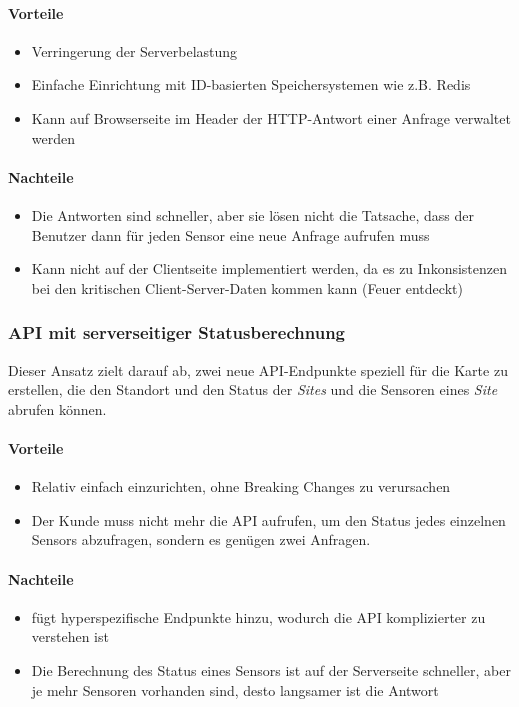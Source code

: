 \paragraph{Vorteile}
\begin{itemize}
  \item Verringerung der Serverbelastung
  \item Einfache Einrichtung mit ID-basierten Speichersystemen wie z.B. Redis
  \item Kann auf Browserseite im Header der \ac{HTTP}-Antwort einer Anfrage verwaltet werden
\end{itemize}

\paragraph{Nachteile}
\begin{itemize}
  \item Die Antworten sind schneller, aber sie lösen nicht die Tatsache, dass der Benutzer dann für jeden Sensor eine neue Anfrage aufrufen muss
  \item Kann nicht auf der Clientseite implementiert werden, da es zu Inkonsistenzen bei den kritischen Client-Server-Daten kommen kann (Feuer entdeckt)
\end{itemize}

\subsubsection{API mit serverseitiger Statusberechnung} \label{sec:API_serverseitiger_Statusberechnung}

Dieser Ansatz zielt darauf ab, zwei neue API-Endpunkte speziell für die Karte zu erstellen, die den Standort und den Status der \textit{Sites} und die Sensoren eines \textit{Site} abrufen können.

\paragraph{Vorteile}
\begin{itemize}
  \item Relativ einfach einzurichten, ohne Breaking Changes zu verursachen
  \item Der Kunde muss nicht mehr die API aufrufen, um den Status jedes einzelnen Sensors abzufragen, sondern es genügen zwei Anfragen.
\end{itemize}

\paragraph{Nachteile}
\begin{itemize}
  \item fügt hyperspezifische Endpunkte hinzu, wodurch die API komplizierter zu verstehen ist
  \item Die Berechnung des Status eines Sensors ist auf der Serverseite schneller, aber je mehr Sensoren vorhanden sind, desto langsamer ist die Antwort
\end{itemize}

